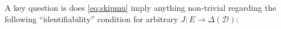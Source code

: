 



A key question is does \ref{eq:skipmu} imply anything non-trivial regarding the following ``identifiability'' condition for arbitrary $J:E\to \Delta(\mathcal{D})$:

